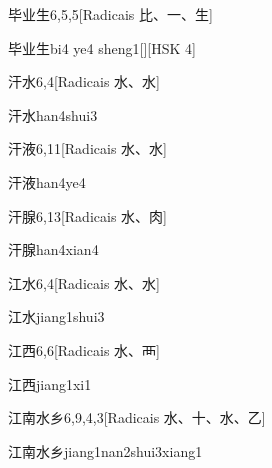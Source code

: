 \begin{entry}{毕业生}{6,5,5}[Radicais ⽐、⼀、⽣]
  \begin{phonetics}{毕业生}{bi4 ye4 sheng1}[][HSK 4]
  \end{phonetics}
\end{entry}

\begin{entry}{汗水}{6,4}[Radicais ⽔、⽔]
  \begin{phonetics}{汗水}{han4shui3}
  \end{phonetics}
\end{entry}

\begin{entry}{汗液}{6,11}[Radicais ⽔、⽔]
  \begin{phonetics}{汗液}{han4ye4}
  \end{phonetics}
\end{entry}

\begin{entry}{汗腺}{6,13}[Radicais ⽔、⾁]
  \begin{phonetics}{汗腺}{han4xian4}
  \end{phonetics}
\end{entry}

\begin{entry}{江水}{6,4}[Radicais ⽔、⽔]
  \begin{phonetics}{江水}{jiang1shui3}
  \end{phonetics}
\end{entry}

\begin{entry}{江西}{6,6}[Radicais ⽔、⾑]
  \begin{phonetics}{江西}{jiang1xi1}
  \end{phonetics}
\end{entry}

\begin{entry}{江南水乡}{6,9,4,3}[Radicais ⽔、⼗、⽔、⼄]
  \begin{phonetics}{江南水乡}{jiang1nan2shui3xiang1}
  \end{phonetics}
\end{entry}

